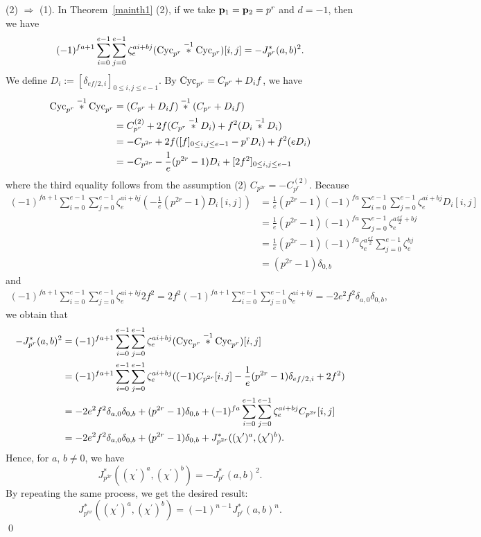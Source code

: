 \documentclass[a4paper, 11pt]{amsart}
\theoremstyle{plain}
\theoremstyle{definition}
\numberwithin{equation}{section}
\begin{document}
(2) $\Rightarrow$ (1). 
%
In Theorem~\ref{mainth1} (2), if we take ${\bf p}_1={\bf p}_2=p^r$ 
and $d=-1$, then we have
\begin{align*}
(-1)^{f a +1} \sum_{i=0}^{e-1}\sum_{j=0}^{e-1}\zeta_e^{ai+bj}({\rm Cyc}_{p^r}\overset{-1}{\ast}{\rm Cyc}_{p^r})[i,j] = -J^\ast_{p^r}(a,b)^2. 
\end{align*}
We define $D_{i}:=[\delta_{ef/2 ,i}]_{0\leq i, j \leq e-1}$. 
By ${\rm Cyc}_{p^r} = C_{p^r} + D_{i}f$, we have
\begin{align*}
{\rm Cyc}_{p^r}\overset{-1}{\ast}{\rm Cyc}_{p^r}
&= (C_{p^r} + D_{i}f) \overset{-1}{\ast} (C_{p^r} + D_{i}f)\\
&= C_{p^r}^{(2)} + 2f(C_{p^r} \overset{-1}{\ast} D_{i}) + f^2(D_{i} \overset{-1}{\ast} D_{i})\\
&=-C_{p^{2r}} + 2f([f]_{0\leq i, j \leq e-1}-p^rD_i) + f^2(eD_{i})\\
&=-C_{p^{2r}} - \frac{1}{e}(p^{2r}-1)D_{i} + [2f^2]_{0\leq i, j \leq e-1}
\end{align*}
where the third equality follows from 
the assumption
(2) $C_{p^{2r}} = -C_{p^r}^{(2)}$. 
Because 
\begin{align*}
(-1)^{f a +1} \sum_{i=0}^{e-1}\sum_{j=0}^{e-1}\zeta_e^{ai+bj}\left(- \frac{1}{e}(p^{2r}-1)D_{i}[i,j]\right)
&=\frac{1}{e}(p^{2r}-1)(-1)^{f a}\sum_{i=0}^{e-1}\sum_{j=0}^{e-1}\zeta_e^{ai+bj}D_{i}[i,j]\\
&=\frac{1}{e}(p^{2r}-1)(-1)^{f a}\sum_{j=0}^{e-1}\zeta_e^{a\frac{ef}{2}+bj}\\
&=\frac{1}{e}(p^{2r}-1)(-1)^{f a}\zeta_e^{a\frac{ef}{2}}\sum_{j=0}^{e-1}\zeta_e^{bj}\\
&=(p^{2r}-1)\delta_{0,b}
\end{align*}
and
\begin{align*}
(-1)^{f a +1} \sum_{i=0}^{e-1}\sum_{j=0}^{e-1}\zeta_e^{ai+bj}2f^2
=2f^2(-1)^{f a +1} \sum_{i=0}^{e-1}\sum_{j=0}^{e-1}\zeta_e^{ai+bj}
=-2e^2f^2\delta_{a,0}\delta_{0,b},
\end{align*}
we obtain that 
\begin{align*}
-J^\ast_{p^r}(a,b)^2
&=(-1)^{f a +1} \sum_{i=0}^{e-1}\sum_{j=0}^{e-1}\zeta_e^{ai+bj}({\rm Cyc}_{p^r}\overset{-1}{\ast}{\rm Cyc}_{p^r})[i,j]\\
&=(-1)^{f a +1} \sum_{i=0}^{e-1}\sum_{j=0}^{e-1}\zeta_e^{ai+bj}((-1)C_{p^{2r}}[i,j] - \frac{1}{e}(p^{2r}-1)\delta_{ef/2 ,i} + 2f^2)\\
&=-2e^2f^2\delta_{a,0}\delta_{0,b} + (p^{2r}-1)\delta_{0,b} + (-1)^{f a}\sum_{i=0}^{e-1}\sum_{j=0}^{e-1}\zeta_e^{ai+bj}C_{p^{2r}}[i,j]\\
&= -2e^2f^2\delta_{a,0}\delta_{0,b} + (p^{2r}-1)\delta_{0,b}  + J_{p^{2r}}^{\ast}((\chi^{\prime})^a, (\chi^{\prime})^b).
\end{align*}
Hence,
for $a$, $b \neq 0$, we have
\[
J_{p^{2r}}^{\ast}((\chi^{\prime})^a, (\chi^{\prime})^b)=-J^\ast_{p^r}(a,b)^2. 
\]
By repeating the same process, we get the desired result:
\[
J_{p^{nr}}^{\ast}((\chi^{\prime})^a, (\chi^{\prime})^b)=(-1)^{n-1}J^\ast_{p^r}(a,b)^n. 
\]
\qed
\end{document}
